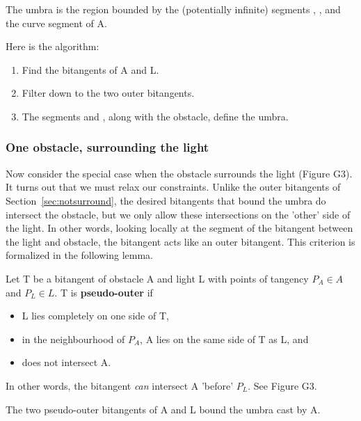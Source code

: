 \documentclass[12pt]{article}
\begin{document}
\begin{lemma}
\label{lem:umbra}
The umbra is the region bounded by the (potentially infinite)
segments , ,
and the curve segment  of A.
\end{lemma}

Here is the algorithm:
\begin{enumerate}
\item Find the bitangents of A and L.
\item Filter down to the two outer bitangents.
\item The segments  and , along with the obstacle, define the umbra.
\end{enumerate}


\subsubsection{One obstacle, surrounding the light}
\label{sec:surround}

Now consider the special case when the obstacle surrounds the light (Figure G3).
It turns out that we must relax our constraints.
Unlike the outer bitangents of Section~\ref{sec:notsurround}, 
the desired bitangents that bound the umbra do intersect the obstacle,
but we only allow these intersections on the 'other' side
of the light.
In other words, looking locally at the segment of the bitangent
between the light and obstacle, the bitangent acts like an outer bitangent.
This criterion is formalized in the following lemma.

\begin{defn2}
Let T be a bitangent of obstacle A and light L with points of tangency $P_A \in A$ and 
$P_L \in L$.
T is {\bf pseudo-outer} if 
\begin{itemize}
\item L lies completely on one side of T,
\item in the neighbourhood of $P_A$, A lies on the same side of T as L, and
\item {} does not intersect A.
\end{itemize}
In other words, the bitangent {\em can} intersect A 'before' $P_L$.
See Figure G3.
\end{defn2}

\begin{lemma}
The two pseudo-outer bitangents of A and L bound the umbra cast by A.
\end{lemma}
\end{document}

